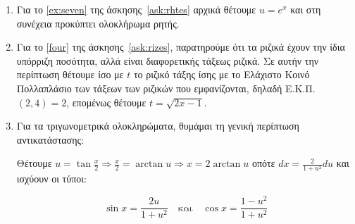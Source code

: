 \begin{center}
  \minibox{\bfseries\large \textcolor{Col1}{Παρατηρήσεις-Υποδείξεις}}
\end{center}

\vspace{\baselineskip}

\begin{enumerate}
  \item Για το \ref{ex:seven} της άσκησης~\eqref{ask:rhtes} αρχικά θέτουμε $
    u = e^{x} $ και στη συνέχεια προκύπτει ολοκλήρωμα ρητής.
  \item Για το \ref{four} της άσκησης~\eqref{ask:rizes}, παρατηρούμε ότι τα ριζικά 
    έχουν την ίδια υπόρριζη ποσότητα, αλλά είναι διαφορετικής τάξεως ριζικά. 
    Σε αυτήν την περίπτωση θέτουμε ίσο με $t$ το ριζικό τάξης ίσης με το Ελάχιστο Κοινό
    Πολλαπλάσιο των τάξεων των ριζικών που εμφανίζονται, δηλαδή Ε.Κ.Π. $(2,4)
    = 2 $, επομένως θέτουμε $t=\sqrt{2x-1}$. 
  \item Για τα τριγωνομετρικά ολοκληρώματα, θυμάμαι τη γενική περίπτωση αντικατάστασης: 
    \begin{center}
      Θέτουμε $ u = \tan{\frac{x}{2}} \Rightarrow \frac{x}{2} = \arctan{u} 
      \Rightarrow x = 2 \arctan {u} $ οπότε $ dx = \frac{2}{1 + u^{2}} du $ 
      και ισχύουν οι τύποι:
    \end{center}
    \[
      \boxed{\sin x=\frac{2u}{1+u^2}} \quad \text{και} \quad \boxed{\cos x
      =\frac{1-u^2}{1+u^2}}
    \] 
\end{enumerate}



